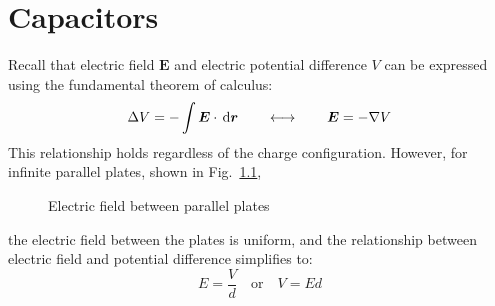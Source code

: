 \chapter{Capacitors}
\label{chapter:capacitors}


Recall that electric field $\bm E$ and electric potential difference $V$ can be
expressed using the fundamental theorem of calculus:
\begin{equation*}
  \Delta V=-\int\bm E\cdot\dl{\bm r}\quad\quad\longleftrightarrow\quad\quad
  \bm E=-\nabla V%
\end{equation*}
This relationship holds regardless of the charge configuration. However, for
infinite parallel plates, shown in Fig.~\ref{fig:parallel-plates},
\begin{figure}[ht]
  \centering
  \caption{Electric field between parallel plates}
  \label{fig:parallel-plates}
\end{figure}
the electric field between the plates is uniform, and the relationship between
electric field and potential difference simplifies to:
\begin{equation*}
  \boxed{E=\frac Vd} \quad\text{or}\quad
  V=Ed
\end{equation*}




